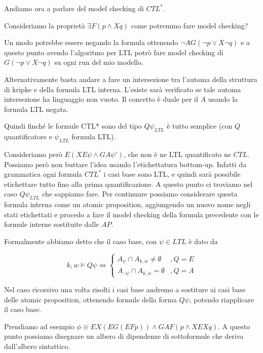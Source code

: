 Andiamo ora a parlare del model checking di \(CTL^*\).

Consideriamo la proprietà \(\exists F(p\land X q)\) come potremmo fare model checking?

Un modo potrebbe essere negando la formula ottenendo \(\neg A G(\neg p \lor X \neg q)\) e a questo punto avendo l'algoritmo per LTL potrò fare model checking di \(G(\neg p \lor X \neg q)\) su ogni run del mio modello.

Alternativamente basta andare a fare un intersezione tra l'automa della struttura di kripke e della formula LTL interna. L'esiste sarà verificato se tale automa intersezione ha linguaggio non vuoto. Il concetto è duale per il \(A\) usando la formula LTL negata.

Quindi finché le formule CTL* sono del tipo \(Q \psi_{LTL}\) è tutto semplice (con \(Q\) quantificatore e \(\psi_{LTL}\) formula LTL\@).

Consideriamo però \(E(X E \psi \land G A \psi')\), che non è ne LTL quantificato ne \(CTL\)\@. Possiamo però non buttare l'idea usando l'etichettatura bottom-up. Infatti da grammatica ogni formula \(CTL^*\) i casi base sono LTL\@, e quindi sarà possibile etichettare tutto fino alla prima quantificazione. A questo punto ci troviamo nel caso \(Q \psi_{LTL}\) che sappiamo fare. Per continuare possiamo considerare questa formula interna come un atomic proposition, aggiungendo un nuovo nome negli stati etichettati e procedo a fare il model checking della formula precedente con le formule interne sostituite dalle \(AP\).

Formalmente abbiamo detto che il caso base, con \(\psi \in LTL\) è dato da

\[k,w\models Q\psi \iff \begin{cases}
  A_{\psi} \cap A_{k,w} \neq \emptyset & ,Q = E \\
  A_{\neg \psi} \cap A_{k,w} = \emptyset & ,Q = A
\end{cases}\]

Nel caso ricorsivo una volta risolti i casi base andremo a sostiture ai casi base delle atomic proposition, ottenendo formule della forma \(Q\psi\), potendo riapplicare il caso base.

Prendiamo ad esempio \(\phi \equiv EX(EG(EFp)) \land GAF(p\land XEXq)\). A questo punto possiamo disegnare un albero di dipendenze di sottoformule che deriva dall'albero sintattico.

\begin{center}
\end{center}

